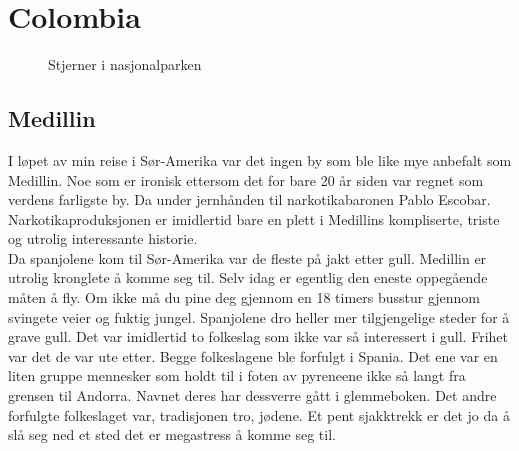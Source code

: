 \clearpage
\section*{Colombia}

\begin{figure}[!h]
	\centering
\noindent{}
	\caption{Stjerner i nasjonalparken}
\label{fig:colombia}
\end{figure}

\subsection*{Medillin}
I løpet av min reise i Sør-Amerika var det ingen by som ble like mye
anbefalt som Medillin. Noe som er ironisk ettersom det for bare 20 år
siden var regnet som verdens farligste by. Da under jernhånden til
narkotikabaronen Pablo Escobar. Narkotikaproduksjonen er imidlertid
bare en plett i Medillins kompliserte, triste og utrolig interessante
historie.  \\

Da spanjolene kom til Sør-Amerika var de fleste på jakt etter gull.
Medillin er utrolig kronglete å komme seg til. Selv idag er egentlig
den eneste oppegående måten å fly. Om ikke må du
pine deg gjennom en 18 timers busstur gjennom svingete veier og fuktig
jungel. Spanjolene dro heller mer tilgjengelige steder for å grave
gull. Det var imidlertid to folkeslag som ikke var så interessert i
gull. Frihet var det de var ute etter. Begge folkeslagene ble
forfulgt i Spania. Det ene var en liten gruppe mennesker som holdt
til i foten av pyreneene ikke så langt fra grensen til Andorra. Navnet deres har dessverre gått i
glemmeboken. Det andre forfulgte folkeslaget var, tradisjonen tro,
jødene. Et pent sjakktrekk er det jo da å slå seg ned et sted det er
megastress å komme seg
til.\\


